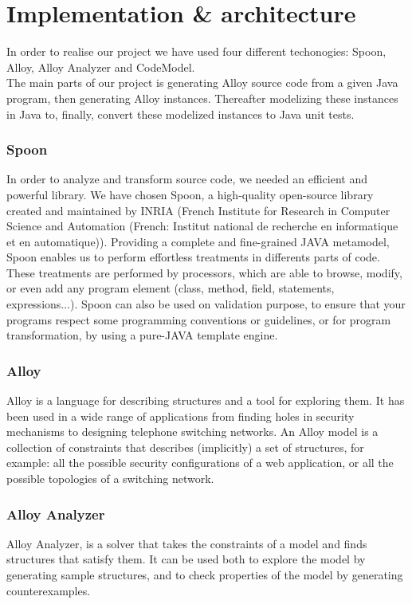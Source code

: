 \section{Implementation \& architecture}
\label{sec:Implementation}
In order to realise our project we have used four different techonogies: Spoon, Alloy, Alloy Analyzer and CodeModel.\\
The main parts of our project is generating Alloy source code from a given Java program, then generating Alloy instances. Thereafter modelizing these instances in Java to, finally, convert these modelized instances to Java unit tests.

\subsubsection{Spoon}
In order to analyze and transform source code, we needed an efficient and powerful library.
We have chosen Spoon, a high-quality open-source library created and maintained by INRIA
(French Institute for Research in Computer Science and Automation (French: Institut national
de recherche en informatique et en automatique)). Providing a complete and fine-grained
JAVA metamodel, Spoon enables us to perform effortless treatments in differents parts of code.
These treatments are performed by processors, which are able to browse, modify, or even add
any program element (class, method, field, statements, expressions...).\cite{spoon-gforge}\cite{spoon-hal}
Spoon can also be used on validation purpose, to ensure that your programs respect some
programming conventions or guidelines, or for program transformation, by using a pure-JAVA
template engine.\cite{spoon-javasource}
\subsubsection{Alloy}
Alloy is a language for describing structures and a tool for exploring them. It has been used in a wide range of applications from finding holes in security mechanisms to designing telephone switching networks.
An Alloy model is a collection of constraints that describes (implicitly) a set of structures, for example: all the possible security configurations of a web application, or all the possible topologies of a switching network.\cite{alloy}

\subsubsection{Alloy Analyzer}
Alloy Analyzer, is a solver that takes the constraints of a model and finds structures that satisfy them. It can be used both to explore the model by generating sample structures, and to check properties of the model by generating counterexamples.\cite{alloy}


